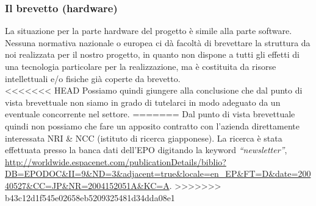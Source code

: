 \subsubsection{Il brevetto (hardware)}
La situazione per la parte hardware del progetto è simile alla parte software.\\
Nessuna normativa nazionale o europea ci dà facoltà di brevettare la struttura da noi realizzata per il nostro progetto, in quanto non dispone a tutti gli effetti di una tecnologia particolare per la realizzazione, ma è costituita da risorse intellettuali e/o fisiche già coperte da brevetto.\\
<<<<<<< HEAD
Possiamo quindi giungere alla conclusione che dal punto di vista brevettuale non siamo in grado di tutelarci in modo adeguato da un eventuale concorrente nel settore.
=======
Dal punto di vista brevettuale quindi non possiamo che fare un apposito contratto con l'azienda direttamente interessata NRI \& NCC (istituto di ricerca giapponese). La ricerca è stata effettuata presso la banca dati dell'EPO digitando la keyword \textit{``newsletter''}, 
\url{http://worldwide.espacenet.com/publicationDetails/biblio?DB=EPODOC\&II=9\&ND=3\&adjacent=true\&locale=en\_EP\&FT=D\&date=20040527\&CC=JP\&NR=2004152051A\&KC=A}.
>>>>>>> b43c12d1f545e02658eb5209325481d34dda08e1

